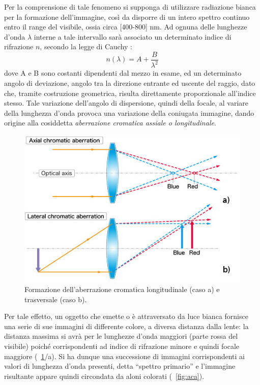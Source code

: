 Per la comprensione di tale fenomeno si supponga di utilizzare radiazione bianca per la formazione dell'immagine, così da disporre di un intero spettro continuo entro il range del visibile, ossia circa [400-800] nm. Ad ognuna delle lunghezze d'onda $\lambda$ interne a tale intervallo sarà associato un determinato indice di rifrazione $n$, secondo la legge di Cauchy \cite{nigro}:
$$n(\lambda) = A + \frac{B}{\lambda ^2}$$
dove A e B sono costanti dipendenti dal mezzo in esame, ed un determinato angolo di deviazione, angolo tra la direzione entrante ed uscente del raggio, dato che, tramite costruzione geometrica, risulta direttamente proporzionale all'indice stesso.
Tale variazione dell'angolo di dispersione, quindi della focale, al variare della lunghezza d'onda provoca una variazione della coniugata immagine, dando origine alla cosiddetta \textit{aberrazione cromatica assiale o longitudinale}. 

\begin{figure}
 \centering
 \includegraphics[scale=.60]{img/CAP2ac.jpg}
 \caption{\small{Formazione dell'aberrazione cromatica longitudinale (caso a) e trasversale (caso b).}}
 \label{fig:ac}
\end{figure}

Per tale effetto, un oggetto che emette o è attraversato da luce bianca fornisce una serie di sue immagini di differente colore, a diversa distanza dalla lente: la distanza massima si avrà per le lunghezze d'onda maggiori (parte rossa del visibile) poiché corrispondenti ad indice di rifrazione minore e quindi focale maggiore (\figurename~\ref{fig:ac}/a). 
Si ha dunque una successione di immagini corrispondenti ai valori di lunghezza d'onda presenti, detta ``spettro primario'' e l'immagine risultante appare quindi circondata da aloni colorati (\figurename~\ref{fig:aca}).

